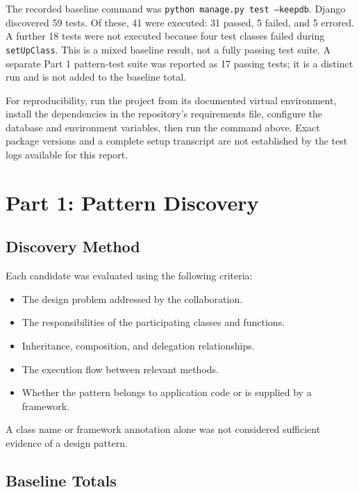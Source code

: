 \documentclass[11pt,a4paper]{article}
\newcommand{\code}[1]{\texttt{#1}}
\begin{document}
The recorded baseline command was \code{python manage.py test --keepdb}.
Django discovered 59 tests. Of these, 41 were executed: 31 passed,
5 failed, and 5 errored. A further 18 tests were not executed because
four test classes failed during \code{setUpClass}. This is a mixed
baseline result, not a fully passing test suite. A separate Part 1
pattern-test suite was reported as 17 passing tests; it is a distinct run
and is not added to the baseline total.

For reproducibility, run the project from its documented virtual
environment, install the dependencies in the repository's requirements
file, configure the database and environment variables, then run
the command above. Exact package versions and a complete setup transcript
are not established by the test logs available for this report.
\section{Part 1: Pattern Discovery}

\subsection{Discovery Method}

Each candidate was evaluated using the following criteria:

\begin{itemize}[leftmargin=*]
    \item The design problem addressed by the collaboration.
    \item The responsibilities of the participating classes
    and functions.
    \item Inheritance, composition, and delegation relationships.
    \item The execution flow between relevant methods.
    \item Whether the pattern belongs to application code
    or is supplied by a framework.
\end{itemize}

A class name or framework annotation alone was not
considered sufficient evidence of a design pattern.

\subsection{Baseline Totals}
\end{document}
